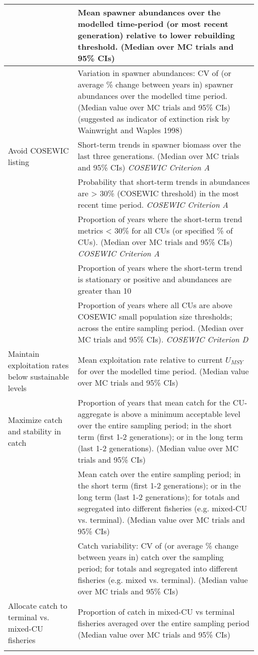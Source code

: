\documentclass[12pt]{article}\usepackage[]{graphicx}\usepackage[]{color}
\begin{document}
\begin{longtable}[t]{>{\raggedright\arraybackslash}p{15em}>{\raggedright\arraybackslash}p{30em}}
\cmidrule(l){2-2}
 & Mean spawner abundances over the modelled time-period (or most recent generation) relative to lower rebuilding threshold. (Median over MC trials and 95\% CIs)\\
\cmidrule(l){2-2}
 & Variation in spawner abundances: CV of (or average \% change between years in) spawner abundances over the modelled time period. (Median value over MC trials and 95\% CIs) (suggested as indicator of extinction risk by Wainwright and Waples 1998)\\
\hline
Avoid COSEWIC listing & Short-term trends in spawner biomass over the last three generations. (Median over MC trials and 95\% CIs) \emph{COSEWIC Criterion A}\\
\cmidrule(l){2-2}
 & Probability that short-term trends in abundances are > 30\% (COSEWIC threshold) in the most recent time period. \emph{COSEWIC Criterion A}\\
\cmidrule(l){2-2}
 & Proportion of years where the short-term trend metrics < 30\% for all CUs (or specified \% of CUs). (Median over MC trials and 95\% CIs) \emph{COSEWIC Criterion A}\\
\cmidrule(l){2-2}
 & Proportion of years where the short-term trend is stationary or positive and abundances are greater than 10\\
\cmidrule(l){2-2}
 & Proportion of years where all CUs are above COSEWIC small population size thresholds; across the entire sampling period. (Median over MC trials and 95\% CIs). \emph{COSEWIC Criterion D}\\
\hline
Maintain exploitation rates below sustainable levels & Mean exploitation rate relative to current $U_{MSY}$ for over the modelled time period. (Median value over MC trials and 95\% CIs)\\
\hline
Maximize catch and stability in catch & Proportion of years that mean catch for the CU-aggregate is above a minimum acceptable level over the entire sampling period; in the short term (first 1-2 generations); or in the long term (last 1-2 generations). (Median value over MC trials and 95\% CIs)\\
\cmidrule(l){2-2}
 & Mean catch over the entire sampling period; in the short term (first 1-2 generations); or in the long term (last 1-2 generations); for totals and segregated into different fisheries (e.g. mixed-CU vs. terminal). (Median value over MC trials and 95\% CIs)\\
\cmidrule(l){2-2}
 & Catch variability: CV of (or average \% change between years in) catch over the sampling period; for totals and segregated into different fisheries (e.g. mixed vs. terminal). (Median value over MC trials and 95\% CIs)\\
\hline
Allocate catch to terminal vs. mixed-CU fisheries & Proportion of catch in mixed-CU vs terminal fisheries averaged over the entire sampling period (Median value over MC trials and 95\% CIs)\\*
\end{longtable}
\endgroup{} \endgroup{}
\end{document}
